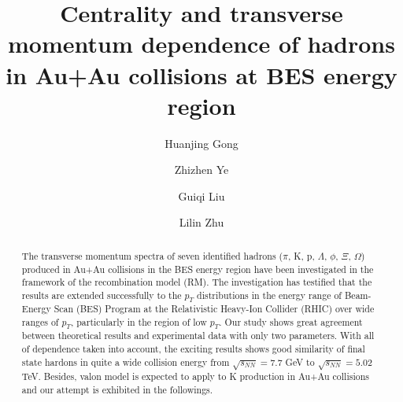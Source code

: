 \documentclass[twocolumn,aps,superscriptaddress,showpacs,nofootinbib,floatfix]{revtex4}
\begin{document}

\title{Centrality and transverse momentum dependence of hadrons in Au+Au collisions at BES energy region}

\author{Huanjing Gong}
\author{Zhizhen Ye}
\author{Guiqi Liu}

\author{Lilin Zhu}


\begin{abstract}
The transverse momentum spectra of seven identified hadrons ($\pi$, K, p, $\Lambda$, $\phi$, $\Xi$, $\Omega$) produced in Au+Au collisions in the BES energy region have been investigated in the framework of the recombination model (RM). The investigation has testified that the results are extended successfully to the $p_T$ distributions in the energy range of Beam-Energy Scan (BES) Program at the Relativistic Heavy-Ion Collider (RHIC) over wide ranges of $p_T$, particularly in the region of low $p_T$. Our study shows great agreement between theoretical results and experimental data with only two parameters. With all of dependence taken into account, the exciting results shows good similarity of final state hardons in quite a wide collision energy from $\sqrt{s_{NN}}=7.7$ GeV to $\sqrt{s_{NN}}=5.02$ TeV. Besides, valon model is expected to apply to K production in Au+Au collisions and our attempt is exhibited in the followings.
\end{abstract}

\keywords{}
\maketitle
\end{document}
